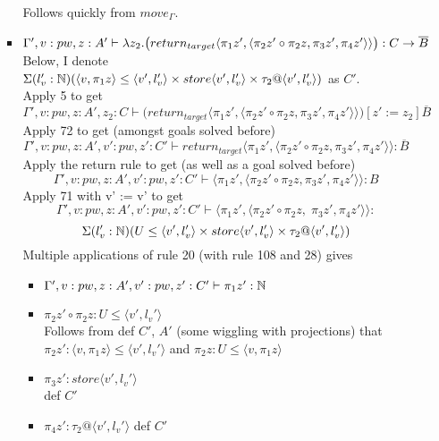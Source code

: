 \documentclass{article}
\begin{document}
\begin{itemize}
\begin{itemize}
\begin{itemize}
 Follows quickly from $move_\Gamma$.
    \item 
    $\Gamma', v: pw, z: A' \vdash \lambda z_2. \big(return_{target}\langle \pi_1 z', \langle \pi_2 z' \circ \pi_2 z, \pi_3 z', \pi_4 z' \rangle \rangle \big) : C \rightarrow \overline{B}$\\
    Below, I denote $\Sigma(l_v' : \mathbb{N})(\langle v, \pi_1 z\rangle \leq \langle v', l_v' \rangle \times store\langle v', l_v' \rangle \times \tau_2 @ \langle v', l_v' \rangle)$ as $C'$.\\
    Apply 5 to get 
    \[\Gamma', v: pw, z: A', z_2: C \vdash  \big(return_{target}\langle \pi_1 z', \langle \pi_2 z' \circ \pi_2 z, \pi_3 z', \pi_4 z' \rangle \rangle \big)[z' := z_2] \overline{B}\]
    Apply 72 to get (amongst goals solved before)
    \[\Gamma', v: pw, z: A', v': pw, z': C' \vdash  return_{target}\langle \pi_1 z', \langle \pi_2 z' \circ \pi_2 z, \pi_3 z', \pi_4 z' \rangle \rangle: \overline{B}\]
    Apply the return rule to get (as well as a goal solved before)
    \[\Gamma', v: pw, z: A', v': pw, z': C' \vdash 
    \langle \pi_1 z', \langle \pi_2 z' \circ \pi_2 z, \pi_3 z', \pi_4 z' \rangle \rangle : B
    \]
    Apply 71 with v' := v' to get 
     \[\Gamma', v: pw, z: A', v': pw, z': C' \vdash 
    \langle \pi_1 z', \langle \pi_2 z' \circ \pi_2 z,\; \pi_3 z', \pi_4 z' \rangle \rangle :\]
    \[\Sigma(l_v' : \mathbb{N})(U \leq \langle v', l_v' \rangle \times store\langle v', l_v' \rangle \times \tau_2 @ \langle v', l_v' \rangle)
    \]
    Multiple applications of rule 20 (with rule 108 and 28) gives
    \begin{itemize}
        \item $\Gamma', v: pw, z: A', v': pw, z': C' \vdash 
\pi_1 z' : \mathbb{N}$
\item $\pi_2 z' \circ \pi_2 z : U \leq \langle v', l_v' \rangle$\\
Follows from def $C'$, $A'$ (some wiggling with projections)
that $\pi_2 z' : \langle v, \pi_1 z \rangle \leq \langle v', l_v' \rangle$ and $\pi_2 z :U \leq \langle v, \pi_1 z \rangle$
\item $\pi_3 z' : store\langle v', l_v' \rangle $\\
def $C'$
\item $\pi_4 z' : \tau_2 @ \langle v', l_v' \rangle$
def $C'$
    \end{itemize}
\end{itemize}

\end{itemize}

\end{itemize}
\end{document}
